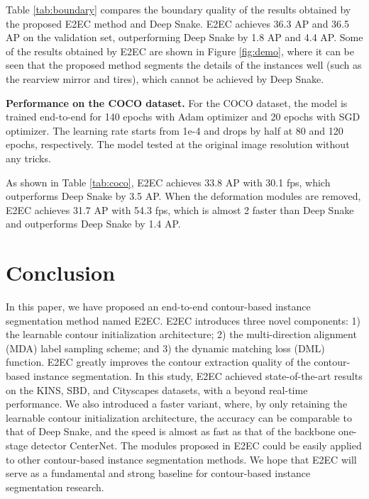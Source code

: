 \documentclass[10pt,twocolumn,letterpaper]{article}
\begin{document}
Table \ref{tab:boundary} compares the boundary quality of the results obtained by the proposed E2EC method and Deep Snake. E2EC achieves 36.3 AP and 36.5 AP on the validation set, outperforming Deep Snake by 1.8 AP and 4.4 AP. Some of the results obtained by E2EC are shown in Figure \ref{fig:demo}, where it can be seen that the proposed method segments the details of the instances well (such as the rearview mirror and tires), which cannot be achieved by Deep Snake.

\textbf{Performance on the COCO dataset.} For the COCO dataset, the model is trained end-to-end for 140 epochs with Adam optimizer and 20 epochs with SGD optimizer. The learning rate starts from 1e-4 and drops by half at 80 and 120 epochs, respectively. The model tested at the original image resolution without any tricks.

As shown in Table \ref{tab:coco}, E2EC achieves 33.8 AP with 30.1 fps, which outperforms Deep Snake by 3.5 AP. When the deformation modules are removed, E2EC achieves 31.7 AP with 54.3 fps, which is almost 2 faster than Deep Snake and outperforms Deep Snake by 1.4 AP. 
\vspace{-3mm}\section{Conclusion}\vspace{-2mm}
\label{sec:conclusion}
In this paper, we have proposed an end-to-end contour-based instance segmentation method named E2EC. E2EC introduces three novel components: 1) the learnable contour initialization architecture; 2) the multi-direction alignment (MDA) label sampling scheme; and 3) the  dynamic matching loss (DML) function. E2EC greatly improves the contour extraction quality of the contour-based instance segmentation. In this study, E2EC achieved state-of-the-art results on the KINS, SBD, and Cityscapes datasets, with a beyond real-time performance. We also introduced a faster variant, where, by only retaining the learnable contour initialization architecture, the accuracy can be comparable to that of Deep Snake, and the speed is almost as fast as that of the backbone one-stage detector CenterNet. The modules proposed in E2EC could be easily applied to other contour-based instance segmentation methods. We hope that E2EC will serve as a fundamental and strong baseline for contour-based instance segmentation research.
{\small\vspace{-9mm}


}
\end{document}
